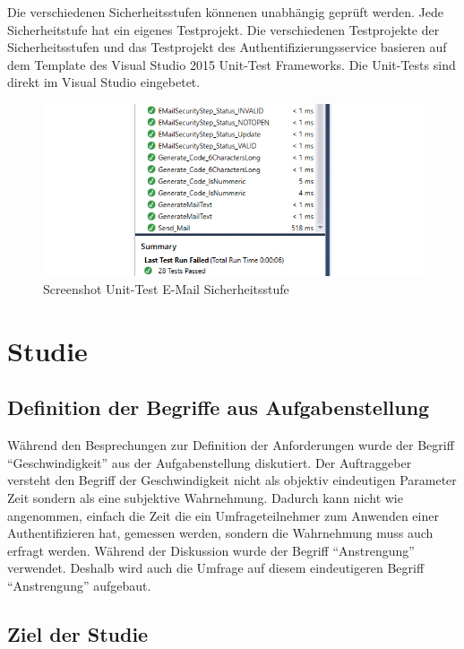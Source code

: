 Die verschiedenen Sicherheitsstufen könnenen unabhängig geprüft werden.
Jede Sicherheitstufe hat ein eigenes Testprojekt. Die verschiedenen
Testprojekte der Sicherheitsstufen und das Testprojekt des
Authentifizierungsservice basieren auf dem Template des Visual Studio
2015 Unit-Test Frameworks. Die Unit-Tests sind direkt im Visual Studio
eingebetet.

\begin{figure}[htbp]
\centering
\includegraphics{images/screenshot_test.jpg}
\caption{Screenshot Unit-Test E-Mail Sicherheitsstufe}
\end{figure}

\newpage

\chapter{Studie}\label{studie}

\section{Definition der Begriffe aus
Aufgabenstellung}\label{definition-der-begriffe-aus-aufgabenstellung}

Während den Besprechungen zur Definition der Anforderungen wurde der
Begriff ``Geschwindigkeit'' aus der Aufgabenstellung diskutiert. Der
Auftraggeber versteht den Begriff der Geschwindigkeit nicht als objektiv
eindeutigen Parameter Zeit sondern als eine subjektive Wahrnehmung.
Dadurch kann nicht wie angenommen, einfach die Zeit die ein
Umfrageteilnehmer zum Anwenden einer Authentifizieren hat, gemessen
werden, sondern die Wahrnehmung muss auch erfragt werden. Während der
Diskussion wurde der Begriff ``Anstrengung'' verwendet. Deshalb wird
auch die Umfrage auf diesem eindeutigeren Begriff ``Anstrengung''
aufgebaut.

\section{Ziel der Studie}\label{ziel-der-studie}

